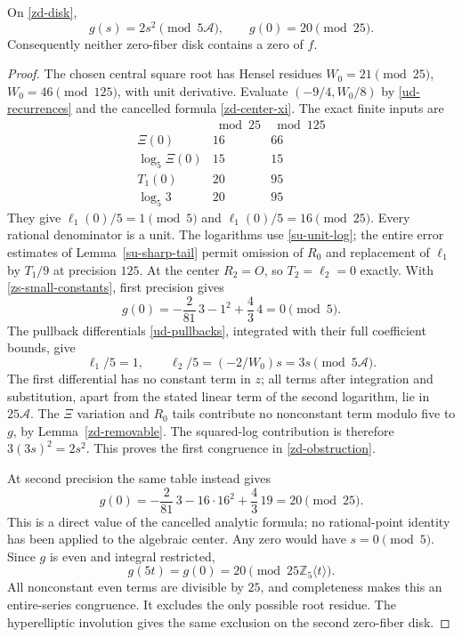\begin{theorem}
\label{zd-no-zeros}
On \eqref{zd-disk},
\begin{equation}
 g(s)=2s^2\pmod{5\mathcal A},\qquad g(0)=20\pmod{25}.
 \label{zd-obstruction}
\end{equation}
Consequently neither zero-fiber disk contains a zero of \(f\).
\end{theorem}
\begin{proof}
The chosen central square root has Hensel residues
\(W_0=21\pmod{25}\), \(W_0=46\pmod{125}\), with unit derivative.
Evaluate \((-9/4,W_0/8)\) by \eqref{ud-recurrences} and the
cancelled formula \eqref{zd-center-xi}. The exact finite inputs are
\[
\begin{array}{c|rr}
 &\bmod25&\bmod125\\\hline
 \Xi(0)&16&66\\
 \log_5\Xi(0)&15&15\\
 T_1(0)&20&95\\
 \log_5 3&20&95
\end{array}
\]
They give \(\ell_1(0)/5=1\pmod5\) and
\(\ell_1(0)/5=16\pmod{25}\). Every rational denominator is a unit.
The logarithms use \eqref{su-unit-log}; the entire error estimates
of Lemma~\ref{su-sharp-tail} permit omission of \(R_0\) and
replacement of \(\ell_1\) by \(T_1/9\) at precision \(125\).
At the center \(R_2=O\), so \(T_2=\ell_2=0\) exactly.
With \eqref{zs-small-constants}, first precision gives
\[
 g(0)=-\frac2{81}\,3-1^2+\frac43\,4=0\pmod5.
\]
The pullback differentials \eqref{ud-pullbacks}, integrated with
their full coefficient bounds, give
\[
 \ell_1/5=1,\qquad \ell_2/5=(-2/W_0)s=3s\pmod{5\mathcal A}.
\]
The first differential has no constant term in \(z\); all terms
after integration and substitution, apart from the stated linear
term of the second logarithm, lie in \(25\mathcal A\).
The \(\Xi\) variation and \(R_0\) tails contribute no nonconstant
term modulo five to \(g\), by Lemma~\ref{zd-removable}.
The squared-log contribution is therefore \(3(3s)^2=2s^2\).
This proves the first congruence in \eqref{zd-obstruction}.

At second precision the same table instead gives
\[
 g(0)=-\frac2{81}\,3-16\cdot16^2+\frac43\,19=20\pmod{25}.
\]
This is a direct value of the cancelled analytic formula; no
rational-point identity has been applied to the algebraic center.
Any zero would have \(s=0\pmod5\). Since \(g\) is even and
integral restricted,
\[
 g(5t)=g(0)=20\pmod{25\mathbb Z_5\langle t\rangle}.
\]
All nonconstant even terms are divisible by \(25\), and
completeness makes this an entire-series congruence. It excludes
the only possible root residue. The hyperelliptic involution gives
the same exclusion on the second zero-fiber disk.
\end{proof}


